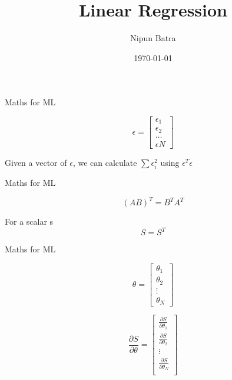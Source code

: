 \documentclass{beamer}
\title{Linear Regression}
\date{\today}
\author{Nipun Batra}
\institute{IIT Gandhinagar}
\begin{document}
  \maketitle
  
  
  

\begin{frame}{Maths for ML}

$$
\epsilon = \begin{bmatrix}
    \epsilon_{1}   \\
    \epsilon_{2}   \\
    \dots \\
    \epsilon{N}
\end{bmatrix}    
$$

Given a vector of $\epsilon$, we can calculate $\sum \epsilon_{i}^{2}$ using $\epsilon^{T}\epsilon$
\end{frame}

\begin{frame}{Maths for ML}

$$
(AB)^{T} = B^{T}A^{T}    
$$



For a scalar s
$$
S = S^{T}    
$$

\end{frame}


\begin{frame}{Maths for ML}

    
    
  \begin{equation*}
      \theta = \begin{bmatrix}
  \theta_{1}\\
  \theta_{2}\\
  \vdots\\
  \theta_{N}
    \end{bmatrix}   
  
  \end{equation*} 


   
 
  \begin{equation*}
        \frac{\partial S}{\partial \theta} = \begin{bmatrix}
  \frac{\partial S}{\partial \theta_{1}}\\
  \frac{\partial S}{\partial \theta_{2}}\\
    \vdots\\
  \frac{\partial S}{\partial \theta_{N}}\\
    \end{bmatrix}
  \end{equation*}
      
    
    

\end{frame}
\end{document}
